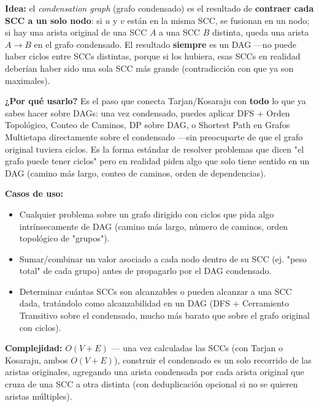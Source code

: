 \documentclass[10pt,a4paper,twocolumn]{article}
\begin{document}
\textbf{Idea:} el \textit{condensation graph} (grafo condensado) es
el resultado de \textbf{contraer cada SCC a un solo nodo}: si $u$ y
$v$ están en la misma SCC, se fusionan en un nodo; si hay una arista
original de una SCC $A$ a una SCC $B$ distinta, queda una arista
$A \to B$ en el grafo condensado. El resultado \textbf{siempre} es un
DAG —no puede haber ciclos entre SCCs distintas, porque si los
hubiera, esas SCCs en realidad deberían haber sido una sola SCC más
grande (contradicción con que ya son maximales).

\textbf{¿Por qué usarlo?} Es el paso que conecta Tarjan/Kosaraju con
\textbf{todo} lo que ya sabes hacer sobre DAGs: una vez condensado,
puedes aplicar DFS + Orden Topológico, Conteo de Caminos, DP sobre
DAG, o Shortest Path en Grafos Multietapa directamente sobre el
condensado —sin preocuparte de que el grafo original tuviera ciclos.
Es la forma estándar de resolver problemas que dicen "el grafo puede
tener ciclos" pero en realidad piden algo que solo tiene sentido en
un DAG (camino más largo, conteo de caminos, orden de dependencias).

\textbf{Casos de uso:}

\begin{itemize}
	\item Cualquier problema sobre un grafo dirigido con ciclos que
	pida algo intrínsecamente de DAG (camino más largo, número de
	caminos, orden topológico de "grupos").
	\item Sumar/combinar un valor asociado a cada nodo dentro de su
	SCC (ej. "peso total" de cada grupo) antes de propagarlo por el
	DAG condensado.
	\item Determinar cuántas SCCs son alcanzables o pueden alcanzar
	a una SCC dada, tratándolo como alcanzabilidad en un DAG (DFS +
	Cerramiento Transitivo sobre el condensado, mucho más barato que
	sobre el grafo original con ciclos).
\end{itemize}

\textbf{Complejidad:} $O(V + E)$ — una vez calculadas las SCCs
(con Tarjan o Kosaraju, ambos $O(V+E)$), construir el condensado es
un solo recorrido de las aristas originales, agregando una arista
condensada por cada arista original que cruza de una SCC a otra
distinta (con deduplicación opcional si no se quieren aristas
múltiples).
\end{document}
